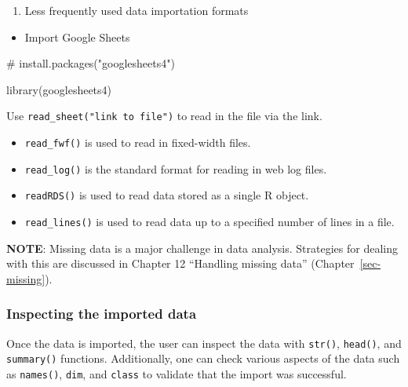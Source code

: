 \documentclass[
  letterpaper,
  DIV=11,
  numbers=noendperiod]{scrreprt}
\newenvironment{Shaded}{}{}
\newcommand{\CommentTok}[1]{\textcolor[rgb]{0.42,0.45,0.49}{#1}}
\newcommand{\FunctionTok}[1]{\textcolor[rgb]{0.44,0.26,0.76}{#1}}
\newcommand{\NormalTok}[1]{\textcolor[rgb]{0.14,0.16,0.18}{#1}}
\providecommand{\tightlist}{%
  \setlength{\itemsep}{0pt}\setlength{\parskip}{0pt}}\usepackage{longtable,booktabs,array}
\begin{document}
\begin{enumerate}
\def\labelenumi{\arabic{enumi}.}
\setcounter{enumi}{1}
\tightlist
\item
  Less frequently used data importation formats
\end{enumerate}

\begin{itemize}
\tightlist
\item
  Import Google Sheets
\end{itemize}

\begin{Shaded}
\begin{Highlighting}[]
\CommentTok{\# install.packages("googlesheets4")}
\end{Highlighting}
\end{Shaded}

\begin{Shaded}
\begin{Highlighting}[]
\FunctionTok{library}\NormalTok{(googlesheets4)}
\end{Highlighting}
\end{Shaded}

Use \texttt{read\_sheet("link\ to\ file")} to read in the file via the
link.

\begin{itemize}
\item
  \texttt{read\_fwf()} is used to read in fixed-width files.
\item
  \texttt{read\_log()} is the standard format for reading in web log
  files.
\item
  \texttt{readRDS()} is used to read data stored as a single R object.
\item
  \texttt{read\_lines()} is used to read data up to a specified number
  of lines in a file.
\end{itemize}

\textbf{NOTE}: Missing data is a major challenge in data analysis.
Strategies for dealing with this are discussed in Chapter 12 ``Handling
missing data'' (Chapter~\ref{sec-missing}).

\subsubsection{Inspecting the imported
data}\label{inspecting-the-imported-data}

Once the data is imported, the user can inspect the data with
\texttt{str()}, \texttt{head()}, and \texttt{summary()} functions.
Additionally, one can check various aspects of the data such as
\texttt{names()}, \texttt{dim}, and \texttt{class} to validate that the
import was successful.
\end{document}
